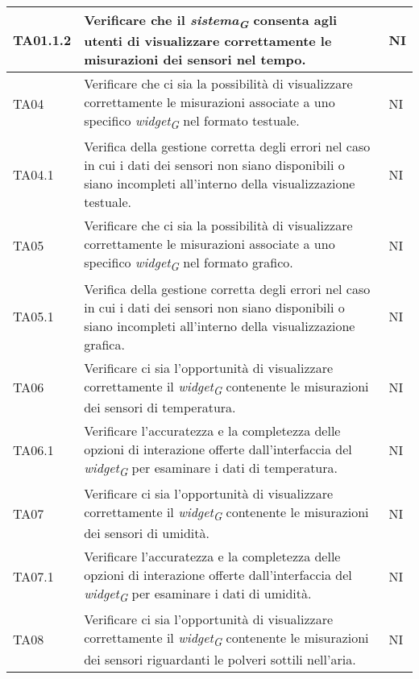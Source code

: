 \begin{longtable}{|C{1.9cm}|L{5cm}|C{2cm}|}
    TA01.1.2 & Verificare che il \textit{sistema}\textsubscript{\textit{G}} consenta agli utenti di visualizzare correttamente le misurazioni dei sensori nel tempo. & NI \\
    \hline
    
    TA04 & Verificare che ci sia la possibilità di visualizzare correttamente le misurazioni associate a uno specifico \textit{widget}\textsubscript{\textit{G}} nel formato testuale.  & NI \\
    \hline
    
    TA04.1 & Verifica della gestione corretta degli errori nel caso in cui i dati dei sensori non siano disponibili o siano incompleti all'interno della visualizzazione testuale. & NI \\
    \hline
    
    TA05 & Verificare che ci sia la possibilità di visualizzare correttamente le misurazioni associate a uno specifico \textit{widget}\textsubscript{\textit{G}} nel formato grafico. & NI \\
    \hline
    
    TA05.1 & Verifica della gestione corretta degli errori nel caso in cui i dati dei sensori non siano disponibili o siano incompleti all'interno della visualizzazione grafica. & NI \\
    \hline
    
    TA06 & Verificare ci sia l'opportunità di visualizzare correttamente il \textit{widget}\textsubscript{\textit{G}} contenente le misurazioni dei sensori di temperatura. & NI \\
    \hline
    
    TA06.1 & Verificare l'accuratezza e la completezza delle opzioni di interazione offerte dall'interfaccia del \textit{widget}\textsubscript{\textit{G}} per esaminare i dati di temperatura. & NI \\
    \hline
    
    TA07 & Verificare ci sia l'opportunità di visualizzare correttamente il \textit{widget}\textsubscript{\textit{G}} contenente le misurazioni dei sensori di umidità. & NI \\
    \hline
    
    TA07.1 & Verificare l'accuratezza e la completezza delle opzioni di interazione offerte dall'interfaccia del \textit{widget}\textsubscript{\textit{G}} per esaminare i dati di umidità. & NI \\
    \hline
    
    TA08 & Verificare ci sia l'opportunità di visualizzare correttamente il \textit{widget}\textsubscript{\textit{G}} contenente le misurazioni dei sensori riguardanti le polveri sottili nell'aria. & NI \\
    \hline
    

\end{longtable}
